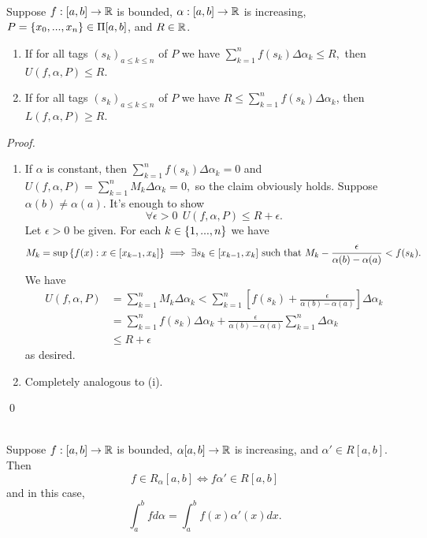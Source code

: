 \begin{lemma} \leavevmode \\
    \label{lemma6.5}
    Suppose $f:[a,b] \to \mathbb{R}$ is bounded, $\alpha: [a,b] \to \mathbb{R}$ is increasing, $P = \left\{x_0,...,x_n\right\} \in \Pi[a,b]$, and $R \in \mathbb{R}$.
    \begin{enumerate}
        \item If for all tags $(s_k)_{a \leq k \leq n}$ of $P$ we have $\sum_{k=1}^{n}f(s_k)\Delta\alpha_k \leq R,$ then $U(f, \alpha, P) \leq R$.
        \item If for all tags $(s_k)_{a \leq k \leq n}$ of $P$ we have $R\leq \sum_{k=1}^{n}f(s_k)\Delta\alpha_k$, then $L(f, \alpha, P) \geq R$.
    \end{enumerate}
\end{lemma}

\begin{proof}
    \begin{enumerate}
        \item If $\alpha$ is constant, then $\sum_{k=1}^{n}f(s_k)\Delta \alpha_k = 0$ and $U(f, \alpha, P) = \sum_{k=1}^{n}M_k \Delta \alpha_k = 0,$ so the claim obviously holds. Suppose $\alpha(b) \neq \alpha(a)$. It's enough to show
        $$\forall \epsilon > 0 ~~U(f, \alpha, P) \leq R + \epsilon.$$
        Let $\epsilon > 0$ be given. For each $k \in \left\{1, ..., n\right\}$ we have
        $$M_k = \sup\left\{f(x) : x \in [x_{k-1}, x_k]\right\} \implies \exists s_k \in [x_{k-1}, x_k] \text{ such that } M_k -\frac{\epsilon}{\alpha(b) - \alpha(a)} < f(s_k).$$
        We have 
        \begin{align*}
            U(f,\alpha, P) &= \sum_{k = 1}^{n}M_k \Delta \alpha_k < \sum_{k=1}^{n}\left[f(s_k) + \frac{\epsilon}{\alpha(b) - \alpha(a)}\right]\Delta \alpha_k \\
            &=\sum_{k=1}^{n}f(s_k)\Delta \alpha_k + \frac{\epsilon}{\alpha(b) - \alpha(a)}\sum_{k=1}^{n}\Delta \alpha_k \\
            &\leq R + \epsilon
        \end{align*}
        as desired.

        \item Completely analogous to (i).
    \end{enumerate}
    \qed
\end{proof}

\begin{theorem} \leavevmode \\
    \label{Thm6.17}
    Suppose $f:[a,b] \to \mathbb{R}$ is bounded, $\alpha[a,b]\to \mathbb{R}$ is increasing, and $\alpha' \in R[a,b].$ Then
    $$f \in R_\alpha[a,b] \iff f\alpha'\in R[a,b]$$
    and in this case,
    $$\int_a^bf d\alpha = \int_a^b f(x)\alpha'(x) dx.$$
\end{theorem}

